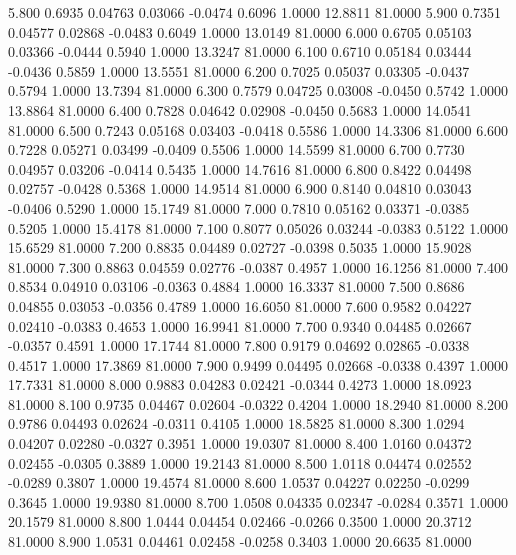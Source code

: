    5.800   0.6935   0.04763   0.03066  -0.0474   0.6096   1.0000  12.8811  81.0000
   5.900   0.7351   0.04577   0.02868  -0.0483   0.6049   1.0000  13.0149  81.0000
   6.000   0.6705   0.05103   0.03366  -0.0444   0.5940   1.0000  13.3247  81.0000
   6.100   0.6710   0.05184   0.03444  -0.0436   0.5859   1.0000  13.5551  81.0000
   6.200   0.7025   0.05037   0.03305  -0.0437   0.5794   1.0000  13.7394  81.0000
   6.300   0.7579   0.04725   0.03008  -0.0450   0.5742   1.0000  13.8864  81.0000
   6.400   0.7828   0.04642   0.02908  -0.0450   0.5683   1.0000  14.0541  81.0000
   6.500   0.7243   0.05168   0.03403  -0.0418   0.5586   1.0000  14.3306  81.0000
   6.600   0.7228   0.05271   0.03499  -0.0409   0.5506   1.0000  14.5599  81.0000
   6.700   0.7730   0.04957   0.03206  -0.0414   0.5435   1.0000  14.7616  81.0000
   6.800   0.8422   0.04498   0.02757  -0.0428   0.5368   1.0000  14.9514  81.0000
   6.900   0.8140   0.04810   0.03043  -0.0406   0.5290   1.0000  15.1749  81.0000
   7.000   0.7810   0.05162   0.03371  -0.0385   0.5205   1.0000  15.4178  81.0000
   7.100   0.8077   0.05026   0.03244  -0.0383   0.5122   1.0000  15.6529  81.0000
   7.200   0.8835   0.04489   0.02727  -0.0398   0.5035   1.0000  15.9028  81.0000
   7.300   0.8863   0.04559   0.02776  -0.0387   0.4957   1.0000  16.1256  81.0000
   7.400   0.8534   0.04910   0.03106  -0.0363   0.4884   1.0000  16.3337  81.0000
   7.500   0.8686   0.04855   0.03053  -0.0356   0.4789   1.0000  16.6050  81.0000
   7.600   0.9582   0.04227   0.02410  -0.0383   0.4653   1.0000  16.9941  81.0000
   7.700   0.9340   0.04485   0.02667  -0.0357   0.4591   1.0000  17.1744  81.0000
   7.800   0.9179   0.04692   0.02865  -0.0338   0.4517   1.0000  17.3869  81.0000
   7.900   0.9499   0.04495   0.02668  -0.0338   0.4397   1.0000  17.7331  81.0000
   8.000   0.9883   0.04283   0.02421  -0.0344   0.4273   1.0000  18.0923  81.0000
   8.100   0.9735   0.04467   0.02604  -0.0322   0.4204   1.0000  18.2940  81.0000
   8.200   0.9786   0.04493   0.02624  -0.0311   0.4105   1.0000  18.5825  81.0000
   8.300   1.0294   0.04207   0.02280  -0.0327   0.3951   1.0000  19.0307  81.0000
   8.400   1.0160   0.04372   0.02455  -0.0305   0.3889   1.0000  19.2143  81.0000
   8.500   1.0118   0.04474   0.02552  -0.0289   0.3807   1.0000  19.4574  81.0000
   8.600   1.0537   0.04227   0.02250  -0.0299   0.3645   1.0000  19.9380  81.0000
   8.700   1.0508   0.04335   0.02347  -0.0284   0.3571   1.0000  20.1579  81.0000
   8.800   1.0444   0.04454   0.02466  -0.0266   0.3500   1.0000  20.3712  81.0000
   8.900   1.0531   0.04461   0.02458  -0.0258   0.3403   1.0000  20.6635  81.0000
